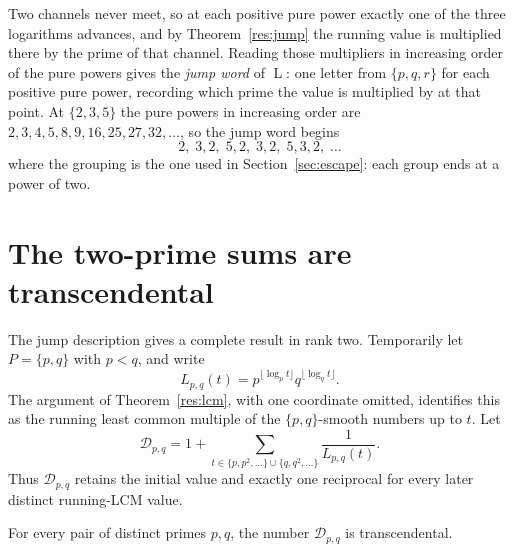 \documentclass[11pt]{article}
\newcommand{\Lprefix}{\operatorname{L}}
\begin{document}
Two channels never meet, so at each positive pure power exactly one of the three
logarithms advances, and by Theorem~\ref{res:jump} the running value is
multiplied there by the prime of that channel.  Reading those multipliers in
increasing order of the pure powers gives the \emph{jump word} of $\Lprefix$:
one letter from $\{p,q,r\}$ for each positive pure power, recording which prime
the value is multiplied by at that point.  At $\{2,3,5\}$ the pure powers in
increasing order are $2,3,4,5,8,9,16,25,27,32,\ldots$, so the jump word begins
\[
 2,\;3,2,\;5,2,\;3,2,\;5,3,2,\;\ldots
\]
where the grouping is the one used in Section~\ref{sec:escape}: each group ends
at a power of two.

\section{The two-prime sums are transcendental}
\label{sec:two-prime}

The jump description gives a complete result in rank two.  Temporarily let
$P=\{p,q\}$ with $p<q$, and write
\[
 L_{p,q}(t)=p^{\lfloor\log_p t\rfloor}q^{\lfloor\log_q t\rfloor}.
\]
The argument of Theorem~\ref{res:lcm}, with one coordinate omitted, identifies
this as the running least common multiple of the $\{p,q\}$-smooth numbers up
to $t$.  Let
\[
 \mathcal D_{p,q}
 =1+\sum_{t\in\{p,p^2,\ldots\}\cup\{q,q^2,\ldots\}}
       \frac1{L_{p,q}(t)} .
\]
Thus $\mathcal D_{p,q}$ retains the initial value and exactly one reciprocal
for every later distinct running-LCM value.

\begin{theorem}
\label{res:two-prime-transcendence}
For every pair of distinct primes $p,q$, the number $\mathcal D_{p,q}$ is
transcendental.
\end{theorem}
\end{document}
